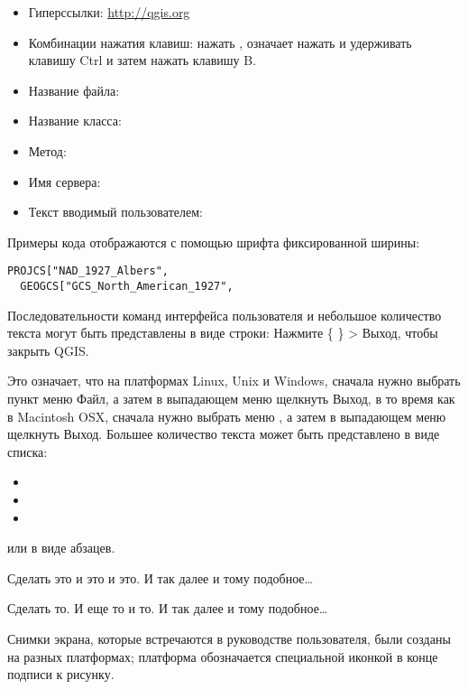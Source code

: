\begin{itemize}[label=--]
\item Гиперссылки: \url{http://qgis.org}
\item Комбинации нажатия клавиш: нажать , означает
нажать и удерживать клавишу Ctrl и затем нажать клавишу B.
\item Название файла: 
\item Название класса: 
\item Метод: 
\item Имя сервера: 
\item Текст вводимый пользователем: 
\end{itemize}

Примеры кода отображаются с помощью шрифта фиксированной ширины:
\begin{verbatim}
PROJCS["NAD_1927_Albers",
  GEOGCS["GCS_North_American_1927",
\end{verbatim}


Последовательности команд интерфейса пользователя и небольшое количество
текста могут быть представлены в виде строки: Нажмите \{\nix{}
\} > Выход, чтобы закрыть QGIS.

Это означает, что на платформах Linux, Unix и Windows, сначала нужно
выбрать пункт меню Файл, а затем в выпадающем меню щелкнуть Выход, в то
время как в Macintosh OSX, сначала нужно выбрать меню \qg,
а затем в выпадающем меню щелкнуть Выход. Большее количество текста
может быть представлено в виде списка:

\begin{itemize}
\item {}
\item {}
\item {}
\end{itemize}

или в виде абзацев.

\nix{} \osx{} Сделать это и это и это. И так далее и тому подобное\dots

\win{}Сделать то. И еще то и то. И так далее и тому подобное\dots

Снимки экрана, которые встречаются в руководстве пользователя, были
созданы на разных платформах; платформа обозначается специальной иконкой
в конце подписи к рисунку.
